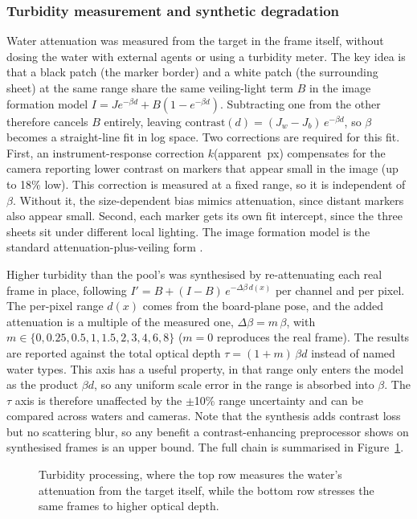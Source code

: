 \subsubsection{Turbidity measurement and synthetic degradation}

Water attenuation was measured from the target in the frame itself, without dosing the water with external agents or using a turbidity meter. The key idea is that a black patch (the marker border) and a white patch (the surrounding sheet) at the same range share the same veiling-light term $B$ in the image formation model $I = J e^{-\beta d} + B(1 - e^{-\beta d})$. Subtracting one from the other therefore cancels $B$ entirely, leaving $\mathrm{contrast}(d) = (J_w - J_b)\,e^{-\beta d}$, so $\beta$ becomes a straight-line fit in log space. Two corrections are required for this fit. First, an instrument-response correction $k$(apparent~px) compensates for the camera reporting lower contrast on markers that appear small in the image (up to 18\% low). This correction is measured at a fixed range, so it is independent of $\beta$. Without it, the size-dependent bias mimics attenuation, since distant markers also appear small. Second, each marker gets its own fit intercept, since the three sheets sit under different local lighting. The image formation model is the standard attenuation-plus-veiling form \cite{jaffe1990computer}.

Higher turbidity than the pool's was synthesised by re-attenuating each real frame in place, following $I' = B + (I - B)\,e^{-\Delta\beta\, d(x)}$ per channel and per pixel. The per-pixel range $d(x)$ comes from the board-plane pose, and the added attenuation is a multiple of the measured one, $\Delta\beta = m\,\beta$, with $m \in \{0, 0.25, 0.5, 1, 1.5, 2, 3, 4, 6, 8\}$ ($m{=}0$ reproduces the real frame). The results are reported against the total optical depth $\tau = (1{+}m)\,\beta d$ instead of named water types. This axis has a useful property, in that range only enters the model as the product $\beta d$, so any uniform scale error in the range is absorbed into $\beta$. The $\tau$ axis is therefore unaffected by the $\pm$10\% range uncertainty and can be compared across waters and cameras. Note that the synthesis adds contrast loss but no scattering blur, so any benefit a contrast-enhancing preprocessor shows on synthesised frames is an upper bound. The full chain is summarised in Figure~\ref{fig:turbpipe}.

\begin{figure}[H]
    \centering
    
    \caption{Turbidity processing, where the top row measures the water's
        attenuation from the target itself, while the bottom row stresses the same
        frames to higher optical depth.}
    \label{fig:turbpipe}
\end{figure}

